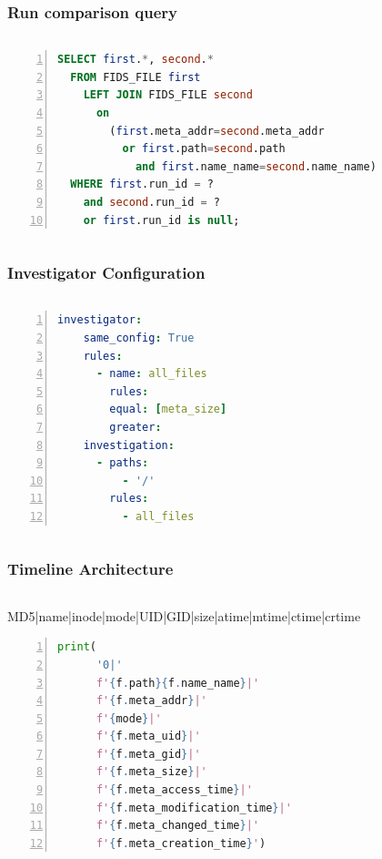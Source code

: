 \documentclass{beamer}
\begin{document}
\begin{frame}[fragile]
  \frametitle{Run comparison query}
  \begin{columns}
    \begin{column}{1\textwidth}
      \begin{lstlisting}[language=sql, numbers=left]
  SELECT first.*, second.* 
  FROM FIDS_FILE first 
    LEFT JOIN FIDS_FILE second 
      on 
        (first.meta_addr=second.meta_addr 
          or first.path=second.path 
            and first.name_name=second.name_name) 
  WHERE first.run_id = ? 
    and second.run_id = ? 
    or first.run_id is null;
      \end{lstlisting}
    \end{column}
  \end{columns}
\end{frame}

\begin{frame}[fragile]
  \frametitle{Investigator Configuration}
  \begin{columns}
    \begin{column}{1\textwidth}
      \begin{lstlisting}[language=yaml, numbers=left]
  investigator:
    same_config: True
    rules: 
      - name: all_files
        rules: 
        equal: [meta_size]
        greater: 
    investigation:
      - paths:
          - '/'
        rules:
          - all_files
      \end{lstlisting}
    \end{column}
  \end{columns}
\end{frame}

\begin{frame}[fragile]
  \frametitle{Timeline Architecture}
  \begin{columns}
    \begin{column}{1\textwidth}
      MD5|name|inode|mode|UID|GID|size|atime|mtime|ctime|crtime
      \begin{lstlisting}[language=python, numbers=left]
print(
      '0|'
      f'{f.path}{f.name_name}|'
      f'{f.meta_addr}|'
      f'{mode}|'
      f'{f.meta_uid}|'
      f'{f.meta_gid}|'
      f'{f.meta_size}|'
      f'{f.meta_access_time}|'
      f'{f.meta_modification_time}|'
      f'{f.meta_changed_time}|'
      f'{f.meta_creation_time}')
      \end{lstlisting}
    \end{column}
  \end{columns}
\end{frame}
\end{document}
